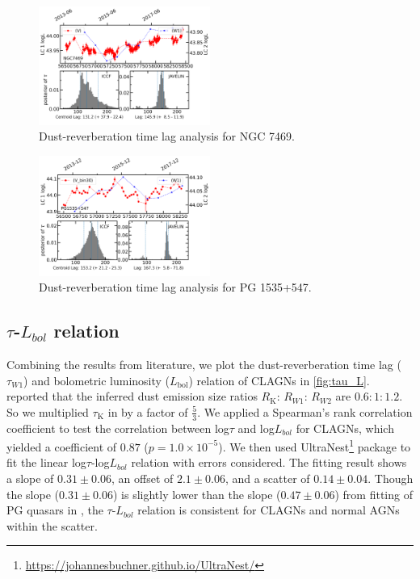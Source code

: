 \documentclass[linenumbers]{aastex631}
\begin{document}
\begin{figure}
\centering
	\includegraphics[width=0.5\textwidth]{pic/NGC7469lag.png}
    \caption{Dust-reverberation time lag analysis for NGC 7469. }
    \label{fig:lag_NGC7469}
\end{figure}
\begin{figure}
\centering
	\includegraphics[width=0.5\textwidth]{pic/PG1535p547lag1.png}
    \caption{Dust-reverberation time lag analysis for PG 1535+547. }
    \label{fig:lag_PG1535}
\end{figure}






\subsection{$\tau$-$L_{bol}$ relation}
Combining the results from literature, we plot the dust-reverberation time lag ($\tau_{W1}$) and bolometric luminosity ($L_\mathrm{bol}$) relation of CLAGNs in \autoref{fig:tau_L}. \citet[][]{2019ApJ...886...33L} reported that the inferred dust emission size ratios $R_\mathrm{K}$: $R_{W1}$: $R_{W2}$ are $0.6: 1: 1.2$. So we multiplied $\tau_\mathrm{K}$ in \citet[][]{2014ApJ...788..159K,2019ApJ...886...33L} by a factor of $\frac{5}{3}$. We applied a Spearman's rank correlation coefficient
to test the correlation between log$\tau$ and log$L_{bol}$ for CLAGNs, which yielded a coefficient of $0.87$ ($p=1.0\times10^{-5}$). We then used UltraNest\footnote{\url{https://johannesbuchner.github.io/UltraNest/}} package \citep{2021JOSS....6.3001B} to fit the linear log$\tau$-log$L_{bol}$ relation with errors considered. The fitting result shows a slope of $0.31 \pm 0.06$, an offset of $2.1 \pm 0.06$, and a scatter of $0.14 \pm 0.04$. Though the slope ($0.31 \pm 0.06$) is slightly lower than the slope ($0.47 \pm 0.06$) from fitting of PG quasars in \citet[][]{2019ApJ...886...33L}, the $\tau$-$L_{bol}$ relation is consistent for CLAGNs and normal AGNs within the scatter.
\end{document}
